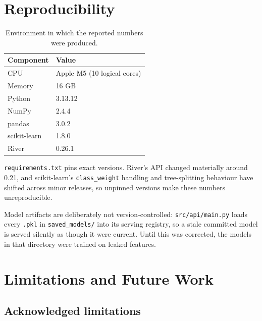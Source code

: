 \documentclass[11pt, a4paper]{article}
\newcommand{\col}[1]{\texttt{\small #1}}
\begin{document}
\section{Reproducibility}

\begin{table}[h]
\centering
\caption{Environment in which the reported numbers were produced.}
\begin{tabular}{ll}
\toprule
\textbf{Component} & \textbf{Value} \\
\midrule
CPU               & Apple M5 (10 logical cores) \\
Memory            & 16 GB \\
Python            & 3.13.12 \\
NumPy             & 2.4.4 \\
pandas            & 3.0.2 \\
scikit-learn      & 1.8.0 \\
River             & 0.26.1 \\
\bottomrule
\end{tabular}
\end{table}

\noindent
\texttt{requirements.txt} pins exact versions. River's API changed materially
around 0.21, and scikit-learn's \texttt{class\_weight} handling and
tree-splitting behaviour have shifted across minor releases, so unpinned versions
make these numbers unreproducible.

Model artifacts are deliberately not version-controlled: \col{src/api/main.py}
loads every \texttt{.pkl} in \texttt{saved\_models/} into its serving registry,
so a stale committed model is served silently as though it were current. Until
this was corrected, the models in that directory were trained on leaked features.

\section{Limitations and Future Work}

\subsection{Acknowledged limitations}
\end{document}
